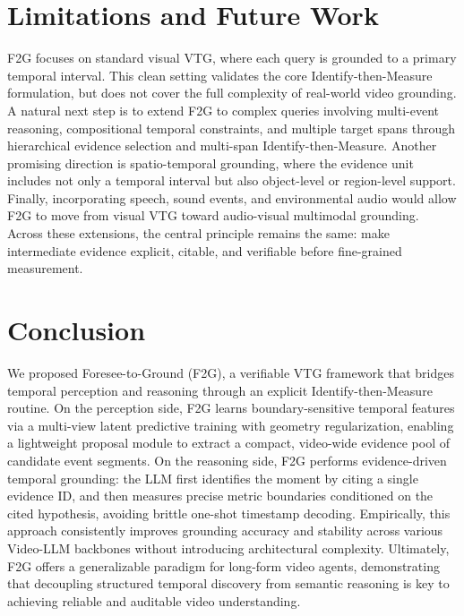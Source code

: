 \documentclass{article}
\theoremstyle{plain}
\theoremstyle{definition}
\theoremstyle{remark}
\begin{document}
\begin{table}[t]
\centering
\caption{\textbf{Evaluation on VideoMME (w/o subtitles).}}
\label{tab:videomme}
\vskip -0.1in
\end{table}

\section{Limitations and Future Work}
\label{sec:limitations}

F2G focuses on standard visual VTG, where each query is grounded to a primary temporal interval.
This clean setting validates the core Identify-then-Measure formulation, but does not cover the full complexity of real-world video grounding.
A natural next step is to extend F2G to complex queries involving multi-event reasoning, compositional temporal constraints, and multiple target spans through hierarchical evidence selection and multi-span Identify-then-Measure.
Another promising direction is spatio-temporal grounding, where the evidence unit includes not only a temporal interval but also object-level or region-level support.
Finally, incorporating speech, sound events, and environmental audio would allow F2G to move from visual VTG toward audio-visual multimodal grounding.
Across these extensions, the central principle remains the same: make intermediate evidence explicit, citable, and verifiable before fine-grained measurement.

\section{Conclusion}
We proposed Foresee-to-Ground (F2G), a verifiable VTG framework that bridges temporal perception and reasoning through an explicit Identify-then-Measure routine.
On the perception side, F2G learns boundary-sensitive temporal features via a multi-view latent predictive training with geometry regularization, enabling a lightweight proposal module to extract a compact, video-wide evidence pool of candidate event segments.
On the reasoning side, F2G performs evidence-driven temporal grounding: the LLM first identifies the moment by citing a single evidence ID, and then measures precise metric boundaries conditioned on the cited hypothesis, avoiding brittle one-shot timestamp decoding.
Empirically, this approach consistently improves grounding accuracy and stability across various Video-LLM backbones without introducing architectural complexity.
Ultimately, F2G offers a generalizable paradigm for long-form video agents, demonstrating that decoupling structured temporal discovery from semantic reasoning is key to achieving reliable and auditable video understanding.
\end{document}
